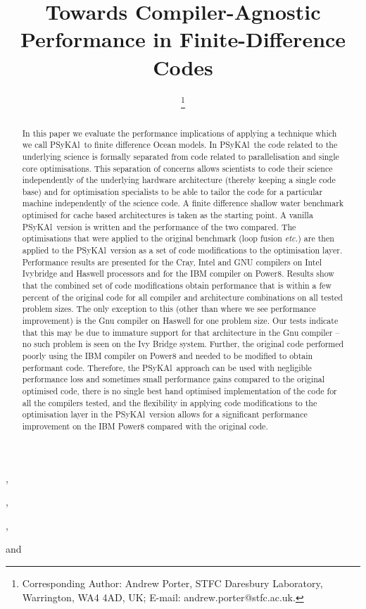 \documentclass{IOS-Book-Article}
\newcommand{\psykal}{{PS}y{KA}l}
\begin{document}
\pagestyle{headings}
\def\thepage{}

\begin{frontmatter}              %
%
\title{Towards Compiler-Agnostic Performance in Finite-Difference Codes}

\author[A]{ %
\thanks{Corresponding Author: Andrew Porter, STFC Daresbury Laboratory, Warrington, WA4 4AD, UK; E-mail:
andrew.porter@stfc.ac.uk.}},
\author[A]{ },
\author[A]{ },
\author[B]{ }
and
\author[C]{ }
\address[A]{STFC Daresbury Laboratory, Warrington, WA4 4AD, UK}
\address[B]{The University of Manchester, UK}
\address[C]{STFC Hartree Centre}

\begin{abstract}
In this paper we evaluate the performance implications of applying a
technique which we call \psykal\ to finite difference Ocean models. 
%
In \psykal\, the code related to the underlying science is formally
separated from code related to parallelisation and single core
optimisations. This separation of concerns allows scientists to code
their science independently of the underlying hardware architecture
(thereby keeping a single code base) and for optimisation specialists
to be able to tailor the code for a particular machine independently
of the science code.
%
A finite difference shallow water benchmark optimised for cache based
architectures is taken as the starting point. A vanilla \psykal\ version
is written and the performance of the two compared. The optimisations
that were applied to the original benchmark (loop fusion {\it etc.}) are then
applied to the \psykal\ version as a set of code modifications to the
optimisation layer. Performance results are presented for the Cray,
Intel and GNU compilers on Intel Ivybridge and Haswell processors and
for the IBM compiler on Power8.
%
Results show that the combined set of code modifications obtain
performance that is within a few percent of the original code for all
compiler and architecture combinations on all tested problem
sizes. The only exception to this (other than where we see performance
improvement) is the Gnu compiler on Haswell for one problem size. Our
tests indicate that this may be due to immature support for that
architecture in the Gnu compiler -- no such problem is seen on the Ivy
Bridge system. Further, the original code performed poorly using the
IBM compiler on Power8 and needed to be modified to obtain performant
code.
Therefore, the \psykal\ approach can be used with negligible
performance loss and sometimes small performance gains compared to the
original optimised code, there is no single best hand optimised
implementation of the code for all the compilers tested, and the
flexibility in applying code modifications to the optimisation layer
in the \psykal\ version allows for a significant performance improvement
on the IBM Power8 compared with the original code.


\end{abstract}
\end{frontmatter}
\end{document}

